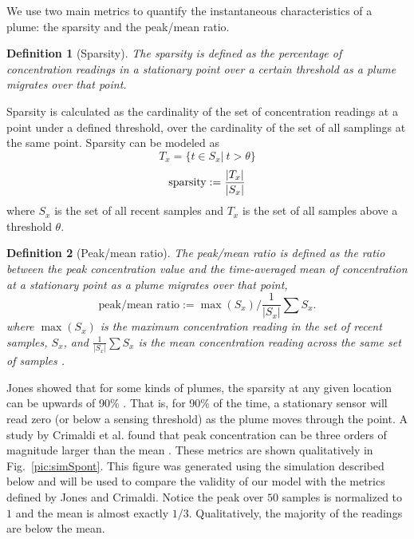 \documentclass[ letterpaper, 10 pt, conference]{ieeeconf}  %
\newtheorem{definition}{Definition}
\begin{document}
We use two main metrics to quantify the instantaneous characteristics of a plume:  the sparsity and the peak/mean ratio. 

\begin{definition}[Sparsity]
The sparsity is defined as the percentage of concentration readings in a stationary point over a certain threshold as a plume migrates over that point.  
\end{definition}


Sparsity is calculated as the cardinality of the set of concentration readings at a point under a defined threshold,  over the cardinality of the set of all samplings at the same point. Sparsity can be modeled as 
\begin{equation}
T_x = \{t \in S_x | \ t> \theta \}
\end{equation}
\begin{equation}
\mbox{sparsity} := \frac{|T_x|}{|S_x|}\\
\end{equation}
where $S_x$ is the set of all recent samples and $T_x$ is the set of all samples above a threshold $\theta$\cite{Jones1983}.


\begin{definition}[Peak/mean ratio]
The peak/mean ratio is defined as the ratio between the peak concentration value and the time-averaged mean of concentration at a stationary point as a plume migrates over that point,
\begin{equation}
\mbox{peak/mean ratio} := \max(S_x)/\frac{1}{|S_x|}\sum{S_x}.
\end{equation}
where $\max(S_x)$ is the maximum concentration reading in the set of recent samples, $S_x$, and $\frac{1}{|S_x|}\sum{S_x}$ is the mean concentration reading across the same set of samples \cite{Crimaldi2002}.

\end{definition}


Jones showed that for some kinds of plumes, the sparsity at any given location can be upwards of 90\% \cite{Jones1983}.  That is, for 90\% of the time, a stationary sensor will read zero (or below a sensing threshold) as the plume moves through the point.   A study by Crimaldi et al. found that peak concentration can be three orders of magnitude larger than the mean \cite{Crimaldi2002}. These metrics are shown qualitatively in Fig.~\ref{pic:simSpont}.  This figure was generated using the simulation described below and will be used to compare the validity of our model with the metrics defined by Jones and Crimaldi.  Notice the peak over $50$ samples is normalized to $1$ and the mean is almost exactly $1/3$.   Qualitatively, the majority of the readings are below the mean. 
\end{document}

